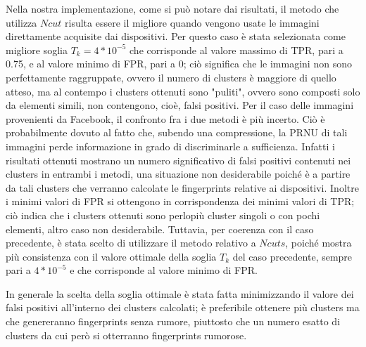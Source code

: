 Nella nostra implementazione, come si può notare dai risultati, il metodo che utilizza $Ncut$ risulta essere il migliore quando vengono usate le immagini direttamente acquisite dai dispositivi. Per questo caso è stata selezionata come migliore soglia $T_{k} = 4*10^{-5}$ che corrisponde al valore massimo di TPR, pari a 0.75, e al valore minimo di FPR, pari a 0; ciò significa che le immagini non sono perfettamente raggruppate, ovvero il numero di clusters è maggiore di quello atteso, ma al contempo i clusters ottenuti sono "puliti", ovvero sono composti solo da elementi simili, non contengono, cioè, falsi positivi.
Per il caso delle immagini provenienti da Facebook, il confronto fra i due metodi è più incerto. Ciò è probabilmente dovuto al fatto che, subendo una compressione, la PRNU di tali immagini perde informazione in grado di discriminarle a sufficienza. Infatti i risultati ottenuti mostrano un numero significativo di falsi positivi contenuti nei clusters in entrambi i metodi, una situazione non desiderabile poiché è a partire da tali clusters che verranno calcolate le fingerprints relative ai dispositivi. Inoltre i minimi valori di FPR si ottengono in corrispondenza dei minimi valori di TPR; ciò indica che i clusters ottenuti sono perlopiù cluster singoli o con pochi elementi, altro caso non desiderabile. Tuttavia, per coerenza con il caso precedente, è stata scelto di utilizzare il metodo relativo a $Ncuts$, poiché mostra più consistenza con il valore ottimale della soglia $T_{k}$ del caso precedente, sempre pari a $4*10^{-5}$ e che corrisponde al valore minimo di FPR.

In generale la scelta della soglia ottimale è stata fatta minimizzando il valore dei falsi positivi all'interno dei clusters calcolati; è preferibile ottenere più clusters ma che genereranno fingerprints senza rumore, piuttosto che un numero esatto di clusters da cui però si otterranno fingerprints rumorose.
